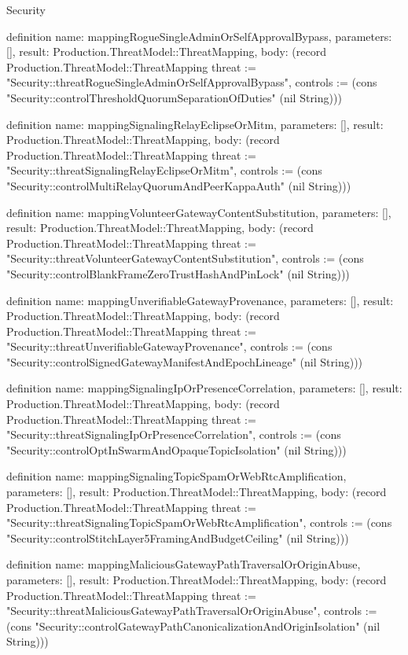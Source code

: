\begin{lexlean}{Security}
\begin{semanticmodule}
definition{
  name: mappingRogueSingleAdminOrSelfApprovalBypass,
  parameters: [],
  result: Production.ThreatModel::ThreatMapping,
  body: (record Production.ThreatModel::ThreatMapping {threat := "Security::threatRogueSingleAdminOrSelfApprovalBypass", controls := (cons "Security::controlThresholdQuorumSeparationOfDuties" (nil String))})
}

definition{
  name: mappingSignalingRelayEclipseOrMitm,
  parameters: [],
  result: Production.ThreatModel::ThreatMapping,
  body: (record Production.ThreatModel::ThreatMapping {threat := "Security::threatSignalingRelayEclipseOrMitm", controls := (cons "Security::controlMultiRelayQuorumAndPeerKappaAuth" (nil String))})
}

definition{
  name: mappingVolunteerGatewayContentSubstitution,
  parameters: [],
  result: Production.ThreatModel::ThreatMapping,
  body: (record Production.ThreatModel::ThreatMapping {threat := "Security::threatVolunteerGatewayContentSubstitution", controls := (cons "Security::controlBlankFrameZeroTrustHashAndPinLock" (nil String))})
}

definition{
  name: mappingUnverifiableGatewayProvenance,
  parameters: [],
  result: Production.ThreatModel::ThreatMapping,
  body: (record Production.ThreatModel::ThreatMapping {threat := "Security::threatUnverifiableGatewayProvenance", controls := (cons "Security::controlSignedGatewayManifestAndEpochLineage" (nil String))})
}

definition{
  name: mappingSignalingIpOrPresenceCorrelation,
  parameters: [],
  result: Production.ThreatModel::ThreatMapping,
  body: (record Production.ThreatModel::ThreatMapping {threat := "Security::threatSignalingIpOrPresenceCorrelation", controls := (cons "Security::controlOptInSwarmAndOpaqueTopicIsolation" (nil String))})
}

definition{
  name: mappingSignalingTopicSpamOrWebRtcAmplification,
  parameters: [],
  result: Production.ThreatModel::ThreatMapping,
  body: (record Production.ThreatModel::ThreatMapping {threat := "Security::threatSignalingTopicSpamOrWebRtcAmplification", controls := (cons "Security::controlStitchLayer5FramingAndBudgetCeiling" (nil String))})
}

definition{
  name: mappingMaliciousGatewayPathTraversalOrOriginAbuse,
  parameters: [],
  result: Production.ThreatModel::ThreatMapping,
  body: (record Production.ThreatModel::ThreatMapping {threat := "Security::threatMaliciousGatewayPathTraversalOrOriginAbuse", controls := (cons "Security::controlGatewayPathCanonicalizationAndOriginIsolation" (nil String))})
}


\end{semanticmodule}
\end{lexlean}
